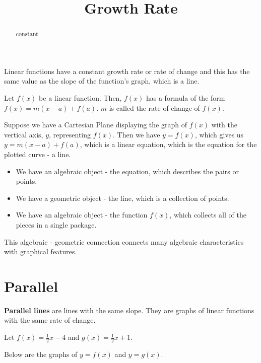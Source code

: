 \documentclass{ximera}
\title{Growth Rate}
\begin{document}
\begin{abstract}
constant
\end{abstract}
\maketitle



Linear functions have a constant growth rate or rate of change and this has the same value as the slope of the function's graph, which is a line.



Let $f(x)$ be a linear function.  Then, $f(x)$ has a formula of the form $f(x) = m(x-a) + f(a)$.  $m$ is called the rate-of-change of $f(x)$.


Suppose we have a Cartesian Plane displaying the graph of $f(x)$ with the vertical axis, $y$, representing $f(x)$.  Then we have $y = f(x)$, which gives us $y = m(x-a) + f(a)$, which is a linear equation, which is the equation for the plotted curve - a line.

\begin{itemize}
\item We have an algebraic object - the equation, which describes the pairs or points. 
\item We have a geometric object - the line, which is a collection of points. 
\item We have an algebraic object - the function $f(x)$, which collects all of the pieces in a single package. 
\end{itemize}


This algebraic - geometric connection connects many algebraic characteristics with graphical features.








\section{Parallel}

\textbf{Parallel lines} are lines with the same slope.  They are graphs of linear functions with the same rate of change.


Let $f(x) = \frac{1}{2} x - 4$ and $g(x) = \frac{1}{2} x + 1$.




Below are the graphs of $y = f(x)$ and $y = g(x)$.
\end{document}
